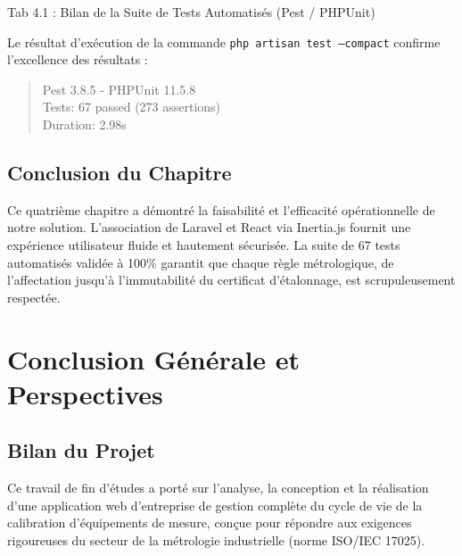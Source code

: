 \documentclass{bts-report}
\begin{document}
\begin{teststable}{Tab 4.1 : Bilan de la Suite de Tests Automatis\'es (Pest / PHPUnit)}
\end{teststable}

\noindent
Le r\'esultat d'ex\'ecution de la commande \texttt{php artisan test --compact} confirme l'excellence des r\'esultats :
\begin{quote}
\ttfamily
Pest 3.8.5 - PHPUnit 11.5.8\\
Tests: 67 passed (273 assertions)\\
Duration: 2.98s
\end{quote}

\section*{Conclusion du Chapitre}
Ce quatri\`eme chapitre a d\'emontr\'e la faisabilit\'e et l'efficacit\'e op\'erationnelle de notre solution. L'association de Laravel et React via Inertia.js fournit une exp\'erience utilisateur fluide et hautement s\'ecuris\'ee. La suite de 67 tests automatis\'es valid\'ee \`a 100\% garantit que chaque r\`egle m\'etrologique, de l'affectation jusqu'\`a l'immutabilit\'e du certificat d'\'etalonnage, est scrupuleusement respect\'ee.


\chapter*{Conclusion G\'en\'erale et Perspectives}

\section*{Bilan du Projet}
Ce travail de fin d'\'etudes a port\'e sur l'analyse, la conception et la r\'ealisation d'une application web d'entreprise de gestion compl\`ete du cycle de vie de la calibration d'\'equipements de mesure, con\c{c}ue pour r\'epondre aux exigences rigoureuses du secteur de la m\'etrologie industrielle (norme ISO/IEC 17025).
\end{document}

